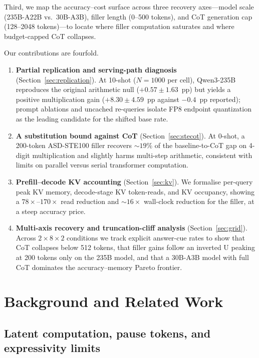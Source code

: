 \documentclass[11pt,a4paper]{article}
\begin{document}
Third, we map the accuracy--cost surface across three recovery axes---model scale
(235B-A22B vs.\ 30B-A3B), filler length (0--500 tokens), and CoT generation cap
(128--2048 tokens)---to locate where filler computation saturates and where
budget-capped CoT collapses.

Our contributions are fourfold.
\begin{enumerate}
    \item \textbf{Partial replication and serving-path diagnosis}
    (Section~\ref{sec:replication}). At 10-shot ($N{=}1000$ per cell), Qwen3-235B
    reproduces the original arithmetic null ($+0.57 \pm 1.63$~pp) but yields a
    positive multiplication gain ($+8.30 \pm 4.59$~pp against $-0.4$~pp
    reported); prompt ablations and uncached re-queries isolate FP8 endpoint
    quantization as the leading candidate for the shifted base rate.
    \item \textbf{A substitution bound against CoT} (Section~\ref{sec:stecot}).
    At 0-shot, a 200-token ASD-STE100 filler recovers ${\sim}19\%$ of the
    baseline-to-CoT gap on 4-digit multiplication and slightly harms multi-step
    arithmetic, consistent with limits on parallel versus serial transformer
    computation.
    \item \textbf{Prefill--decode KV accounting} (Section~\ref{sec:kv}). We
    formalise per-query peak KV memory, decode-stage KV token-reads, and KV
    occupancy, showing a $78\times$--$170\times$ read reduction and ${\sim}16\times$
    wall-clock reduction for the filler, at a steep accuracy price.
    \item \textbf{Multi-axis recovery and truncation-cliff analysis}
    (Section~\ref{sec:grid}). Across $2\times8\times2$ conditions we track explicit
    answer-cue rates to show that CoT collapses below 512 tokens, that filler
    gains follow an inverted U peaking at 200 tokens only on the 235B model, and
    that a 30B-A3B model with full CoT dominates the accuracy--memory Pareto
    frontier.
\end{enumerate}

\section{Background and Related Work}
\label{sec:related}

\subsection{Latent computation, pause tokens, and expressivity limits}
\end{document}
